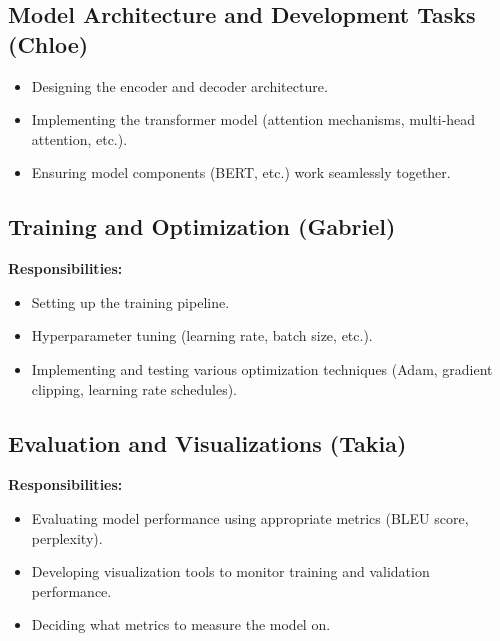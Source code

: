 \documentclass{article}
\begin{document}
\subsection*{Model Architecture and Development Tasks (Chloe)}
\begin{itemize}
  \item Designing the encoder and decoder architecture.
  \item Implementing the transformer model (attention mechanisms, multi-head attention, etc.).
  \item Ensuring model components (BERT, etc.) work seamlessly together.
\end{itemize}

\subsection*{Training and Optimization (Gabriel)}
\textbf{Responsibilities:}
\begin{itemize}
  \item Setting up the training pipeline.
  \item Hyperparameter tuning (learning rate, batch size, etc.).
  \item Implementing and testing various optimization techniques (Adam, gradient clipping, learning rate schedules).
\end{itemize}

\subsection*{Evaluation and Visualizations (Takia)}
\textbf{Responsibilities:}
\begin{itemize}
  \item Evaluating model performance using appropriate metrics (BLEU score, perplexity).
  \item Developing visualization tools to monitor training and validation performance.
  \item Deciding what metrics to measure the model on.
\end{itemize}







\end{document}
